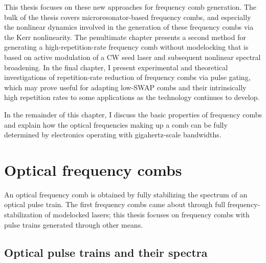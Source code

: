This thesis focuses on these new approaches for frequency comb generation. The bulk of the thesis covers microresonator-based frequency combs, and especially the nonlinear dynamics involved in the generation of these frequency combs via the Kerr nonlinearity. The penultimate chapter presents a second method for generating a high-repetition-rate frequency comb without modelocking that is based on active modulation of a CW seed laser and subsequent nonlinear spectral broadening. In the final chapter, I present experimental and theoretical investigations of repetition-rate reduction of frequency combs via pulse gating, which may prove useful for adapting low-SWAP combs and their intrinsically high repetition rates to some applications as the technology continues to develop.

In the remainder of this chapter, I discuss the basic properties of frequency combs and explain how the optical frequencies making up a comb can be fully determined by electronics operating with gigahertz-scale bandwidths.

\section{Optical frequency combs}

An optical frequency comb is obtained by fully stabilizing the spectrum of an optical pulse train. The first frequency combs came about through full frequency-stabilization of modelocked lasers; this thesis focuses on frequency combs with pulse trains generated through other means.

\subsection{Optical pulse trains and their spectra}

